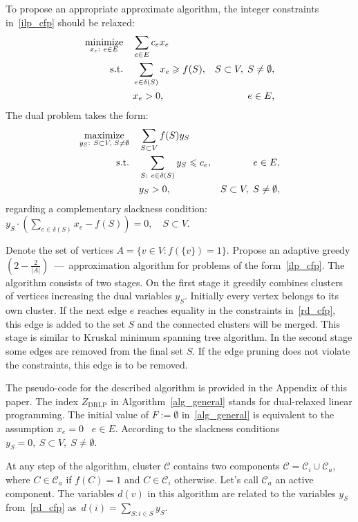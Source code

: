 \documentclass[12pt]{article}
\begin{document}
To propose an appropriate approximate algorithm, the integer constraints in~\eqref{ilp_cfp} should be relaxed:
\begin{align}
\underset{x_e:~e\in E}{\text{minimize}}\quad & \sum\limits_{e\in E}c_ex_e \nonumber\\
\text{s.t.\quad} & \sum\limits_{e\in \delta(S)}x_e\geqslant f(S), & S \subset V, \; S \not= \emptyset,
\label{rlp_cfp}\\
& x_e>0, & e\in E,\nonumber
\end{align}
The dual problem takes the  form:
\begin{align}
\underset{y_S:~S \subset V, \; S \not= \emptyset}{\text{maximize}}\quad & \sum\limits_{S\subset V}f(S)y_S \nonumber\\
\text{s.t.\quad} & \sum\limits_{S:~e\in \delta(S)}y_S\leqslant c_e, & e\in E,
\label{rd_cfp}\\
& y_S>0, &S \subset V, \; S \not= \emptyset,\nonumber
\end{align}
regarding a complementary slackness condition:
$
y_S\cdot \left(\sum\limits_{e\in \delta(S)}x_e - f(S)\right) = 0, \quad S\subset V.
$%


Denote the set of vertices $A=\{v\in V: f(\{v\})=1\}$. Propose an adaptive greedy $\left(2-\frac{2}{|A|}\right)$~---~approximation algorithm for problems of the form~\eqref{ilp_cfp}. The algorithm consists of two stages. On the first stage it greedily combines clusters of vertices increasing the dual variables $y_S$. Initially every vertex belongs to its own cluster. If the next edge $e$ reaches equality in the constraints in~\eqref{rd_cfp}, this edge is added to the set $S$ and the connected clusters will be merged. This stage is similar to Kruskal minimum spanning tree algorithm. %
In the second stage some edges are removed from the final set $S$. If the edge pruning does not violate the constraints, this edge is to be removed.


The pseudo-code for the described algorithm is provided in the Appendix of this paper. The index $Z_{\text{DRLP}}$ in Algorithm~\ref{alg_general} stands for dual-relaxed linear programming. The initial value of $F:=\emptyset$ in~\ref{alg_general} is equivalent to the assumption $x_e = 0 \;\;\; e \in E$. According to the slackness conditions $y_S = 0,~ S \subset V, \; S \not= \emptyset$.


At any step of the algorithm, cluster $\mathcal{C}$ contains two components $\mathcal{C} = \mathcal{C}_i \cup \mathcal{C}_a$, where $C\in\mathcal{C}_a$ if $f(C) = 1$ and $C\in\mathcal{C}_i$ otherwise. Let's call $\mathcal{C}_a$ an active component.
The variables $d(v)$ in this algorithm are related to the variables $y_S$ from~\eqref{rd_cfp} as~$d(i) = \sum\limits_{S:i\in S}y_S.$ %
\end{document}
